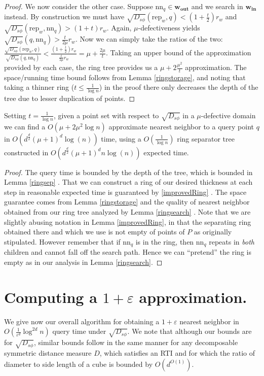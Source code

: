\documentclass[11pt]{myclass}
\newcommand{\sbreg}{\ensuremath{D_{s\phi}}}
\newcommand{\eps}{\varepsilon}
\begin{document}
\begin{proof}
We now consider the other case. Suppose $\text{nn}_q \in \mathbf{w_{\text{out}}}$ and we search 
in $\mathbf{w_{\text{in}}}$ instead.  By construction we must have
 $\sqrt{\sbreg}(\text{rep}_w, q) < \left( 1 + \frac{t}{2} \right) r_w$ and $\sqrt{\sbreg}(\text{rep}_w, \text{nn}_q) > ( 1 + t) r_w$.
Again, $\mu$-defectiveness yields $\sqrt{\sbreg}(q,\text{nn}_q) > \frac{t}{2 \mu} r_w$. Now we can simply take the ratios of the two:
$\frac{\sqrt{\sbreg}(\text{rep}_w,q)}{\sqrt{\sbreg}(q, \text{nn}_q)} < \frac{(1 + \frac{t}{2}) r_w}{\frac{t}{2 \mu} r_w } = \mu + \frac{2 \mu}{t}$. Taking an upper bound of the approximation provided by each case, the ring tree 
provides us a $\mu + 2 \frac{\mu^2}{t}$ approximation. The space/running time bound follows from Lemma \ref{ringstorage}, and noting that taking a thinner ring
($t \leq \frac{1}{\log n}$)  in the proof there only decreases the depth of the tree due to lesser duplication of points.
\end{proof}


\begin{corollary}
Setting $t = \frac{1}{\log n}$, given a point set with respect to $\sqrt{\sbreg}$ in a $\mu$-defective domain we can find a $O(\mu + 2 \mu^2 \log n)$ approximate nearest neighbor to a query point 
$q$ in $O(d^{\frac{d}{2}} (\mu+1)^d \log(n))$ time, using a $O(\frac{1}{\log n})$ ring separator tree constructed in
 $O(d^{\frac{d}{2}} (\mu+1)^d n \log(n))$ expected time.
\end{corollary}

\begin{proof}
 The query time is bounded by the depth of the tree, which is bounded in Lemma \ref{ringsep} . That we can construct
 a ring of our desired thickness at each step in reasonable expected time is guaranteed by \ref{improvedRing} . The space guarantee comes from Lemma \ref{ringstorage} and 
the quality of nearest neighbor obtained from our ring tree analyzed by Lemma \ref{ringsearch} .
Note that we are slightly abusing notation in Lemma \ref{improvedRing}, in that the separating ring
obtained there and which we use is not empty of points of $P$ as originally stipulated. However remember that if $\text{nn}_q$ is in the ring, then $\text{nn}_q$ repeats in \emph{both} children 
and cannot fall off the search path. Hence we can ``pretend'' the ring is empty  as in our analysis in 
Lemma \ref{ringsearch}.
\end{proof}

\section{Computing a $1+\eps$ approximation.}
\label{sec:finalized-algorithm}
We give now our overall algorithm for obtaining a $1 + \eps$ nearest neighbor in $O\left( \frac{1}{\eps^d}\log^{2d} n \right)$ query time under $\sqrt{\sbreg}$. We note that although our bounds are for $\sqrt{\sbreg}$, similar bounds follow in the same manner for any decomposable symmetric distance measure $D$, which satisfies an RTI and for which the ratio of diameter to side
length of a cube is bounded by $O(d^{O(1)})$. 
\end{document}
